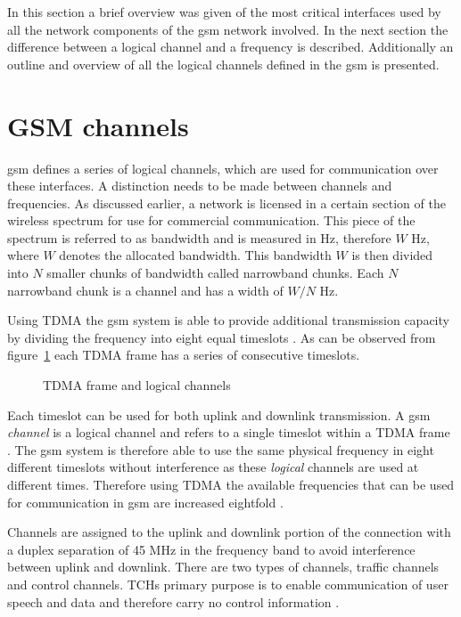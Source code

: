 In this section a brief overview was given of the most critical interfaces used by all the network components of the \gls{gsm} network involved. In the next section the difference between a logical channel and a frequency is described. Additionally an outline and overview of all the logical channels defined in the \gls{gsm} is presented. 
\section{GSM channels}
\label{sec:interfacech}
\gls{gsm} defines a series of logical channels, which are used for communication over these interfaces. A distinction needs to be made between channels and frequencies. As discussed earlier, a network is licensed in a certain section of the wireless spectrum for use for commercial communication. This piece of the spectrum is referred to as bandwidth and is measured in Hz, therefore $W$ Hz, where $W$ denotes the allocated bandwidth\cite{FundamentalsWirelessCommunication}. This bandwidth $W$ is then divided into $N$ smaller chunks of bandwidth called narrowband chunks. Each $N$ narrowband chunk is a channel and has a width of $W/N$ Hz\cite{FundamentalsWirelessCommunication}. 

Using \gls{TDMA} the \gls{gsm} system is able to provide additional transmission capacity by dividing the frequency into eight equal timeslots \cite{wirelesstelcoMullet}. As can be observed from figure~\ref{fig:GSMfrequencies} each \gls{TDMA} frame has a series of consecutive timeslots. 
\begin{figure}[H]
	\begin{centering}
		
		\caption{TDMA frame and logical channels \cite{wirelesstelcoMullet}}
		\label{fig:GSMfrequencies}
	\end{centering}
\end{figure}
Each timeslot can be used for both uplink and downlink transmission. A \gls{gsm} \emph{channel} is a logical channel and refers to a single timeslot within a \gls{TDMA} frame \cite{wirelesstelcoMullet,GSMArchitectureProtocolsServices}.
The \gls{gsm} system is therefore able to use the same physical frequency in eight different timeslots without interference as these \emph{logical} channels are used at different times. Therefore using \gls{TDMA} the available frequencies that can be used for communication in \gls{gsm} are increased eightfold \cite{wirelesstelcoMullet}.

Channels are assigned to the uplink and downlink portion of the connection with a duplex separation of 45 MHz in the frequency band to avoid interference between uplink and downlink. There are two types of channels, traffic channels and control channels. \Glspl{TCH} primary purpose is to enable communication of user speech and data and therefore carry no control information \cite{GSMArchitectureProtocolsServices}.

